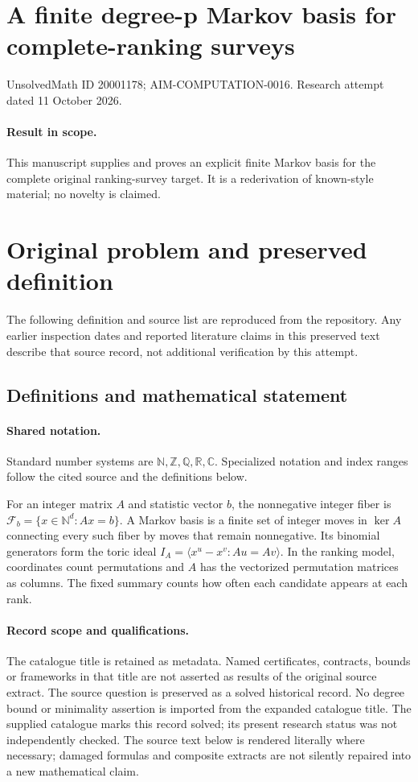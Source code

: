 \documentclass[11pt]{article}
\begin{document}
\section*{A finite degree-p Markov basis for complete-ranking surveys}
\noindent UnsolvedMath ID 20001178; AIM-COMPUTATION-0016. Research attempt dated 11 October 2026.
\paragraph{Result in scope.}This manuscript supplies and proves an explicit finite Markov basis for the complete original ranking-survey target. It is a rederivation of known-style material; no novelty is claimed.
\section{Original problem and preserved definition}
The following definition and source list are reproduced from the repository. Any earlier inspection dates and reported literature claims in this preserved text describe that source record, not additional verification by this attempt.
\subsection{Definitions and mathematical statement}

\paragraph{Shared notation.}Standard number systems are $\mathbb N,\mathbb Z,\mathbb Q,\mathbb R,\mathbb C$. Specialized notation and index ranges follow the cited source and the definitions below.


For an integer matrix $A$ and statistic vector $b$, the nonnegative integer fiber is $\mathcal F_b=\{x\in\mathbb N^d:Ax=b\}$. A Markov basis is a finite set of integer moves in $\ker A$ connecting every such fiber by moves that remain nonnegative. Its binomial generators form the toric ideal $I_A=\langle x^u-x^v:Au=Av\rangle$. In the ranking model, coordinates count permutations and $A$ has the vectorized permutation matrices as columns. The fixed summary counts how often each candidate appears at each rank.
\paragraph{Record scope and qualifications.}
The catalogue title is retained as metadata. Named certificates, contracts, bounds or frameworks in that title are not asserted as results of the original source extract.
The source question is preserved as a solved historical record. No degree bound or minimality assertion is imported from the expanded catalogue title. The supplied catalogue marks this record solved; its present research status was not independently checked.
The source text below is rendered literally where necessary; damaged formulas and composite extracts are not silently repaired into a new mathematical claim.
\end{document}
